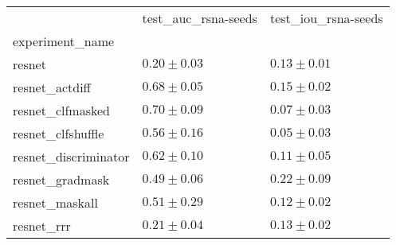 \begin{tabular}{lll}
\toprule
{} & test_auc_rsna-seeds & test_iou_rsna-seeds \\
experiment_name      &                     &                     \\
\midrule
resnet               &       $0.20\pm0.03$ &       $0.13\pm0.01$ \\
resnet_actdiff       &       $0.68\pm0.05$ &       $0.15\pm0.02$ \\
resnet_clfmasked     &       $0.70\pm0.09$ &       $0.07\pm0.03$ \\
resnet_clfshuffle    &       $0.56\pm0.16$ &       $0.05\pm0.03$ \\
resnet_discriminator &       $0.62\pm0.10$ &       $0.11\pm0.05$ \\
resnet_gradmask      &       $0.49\pm0.06$ &       $0.22\pm0.09$ \\
resnet_maskall       &       $0.51\pm0.29$ &       $0.12\pm0.02$ \\
resnet_rrr           &       $0.21\pm0.04$ &       $0.13\pm0.02$ \\
\bottomrule
\end{tabular}
